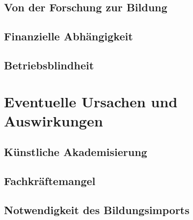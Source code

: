 \documentclass[a4paper,10pt,twoside,titlepage]{article}
\begin{document}
\subsection{Von der Forschung zur Bildung}

\subsection{Finanzielle Abhängigkeit}

\subsection{Betriebsblindheit}

\section{Eventuelle Ursachen und Auswirkungen}

\subsection{Künstliche Akademisierung}

\subsection{Fachkräftemangel}

\subsection{Notwendigkeit des Bildungsimports}
\end{document}
